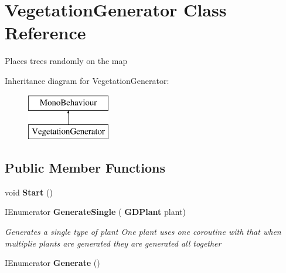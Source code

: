 \section{Vegetation\+Generator Class Reference}
\label{class_vegetation_generator}


Places trees randomly on the map  


Inheritance diagram for Vegetation\+Generator\+:\begin{figure}[H]
\begin{center}
\leavevmode
\includegraphics[height=2.000000cm]{class_vegetation_generator}
\end{center}
\end{figure}
\subsection*{Public Member Functions}
\begin{DoxyCompactItemize}
\item 
void \textbf{ Start} ()
\item 
I\+Enumerator \textbf{ Generate\+Single} (\textbf{ G\+D\+Plant} plant)
\begin{DoxyCompactList}\small\item\em Generates a single type of plant One plant uses one coroutine with that when multiplie plants are generated they are generated all together \end{DoxyCompactList}\item 
I\+Enumerator \textbf{ Generate} ()
\end{DoxyCompactItemize}
